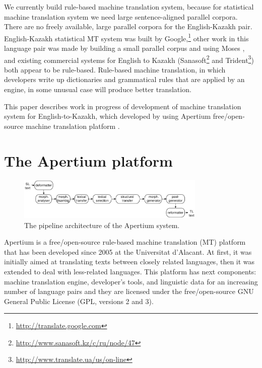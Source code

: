 \documentclass[11pt]{article}
\begin{document}
We currently build rule-based machine translation system, because for statistical machine translation 
system we need large sentence-aligned parallel corpora. There are no freely available, large parallel 
corpora for the English-Kazakh pair. English-Kazakh statistical MT system was built by Google,\footnote{\url{http://translate.google.com}} 
other work in this language pair was made by building a small parallel corpus and using Moses \citep{assylbekov14}, 
and existing commercial systems for English to Kazakh (Sanasoft\footnote{\url{http://www.sanasoft.kz/c/ru/node/47}} and Trident\footnote{\url{http://www.translate.ua/us/on-line}}) both appear to be rule-based. Rule-based machine translation, in which developers 
write up dictionaries and grammatical rules that are applied by an engine, in some 
unusual case will produce better translation.

This paper describes work in progress of development of machine translation system 
for English-to-Kazakh, which developed by using Apertium free/open-source machine 
translation platform \citep{forcada11}. %

\section{The Apertium platform}

\begin{figure}[htbp]
\begin{center}
 \includegraphics[width=0.8\textwidth]{architecture.pdf}
\end{center}
\caption{The pipeline architecture of the Apertium system.}
\label{fig:modules}
\end{figure}


Apertium \citep{forcada11} is a free/open-source rule-based machine translation (MT) platform that 
has been developed since 2005 at the Universitat d'Alacant. At first, it was initially aimed at 
translating texts between closely related languages, then it was extended to deal with less-related 
languages. This platform has next components: machine translation engine, developer's tools, and linguistic 
data for an increasing number of language pairs and they are licensed under the 
free/open-source GNU General Public License (GPL, versions 2 and 3).
\end{document}
